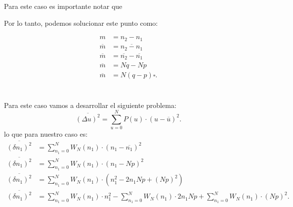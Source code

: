 \documentclass{report}
\begin{document}
\section{}

Para este caso es importante notar que

Por lo tanto, podemos solucionar este punto como:


  \begin{align*}
    m &= n_2 - n_1\\
    \overline{m} &= \overline{n_2 - n_1} \\
    \overline{m} &= \overline{n_2} - \overline{n_1} \\
    \overline{m} &= Nq - Np \\
    \overline{m} &= N\left( q - p \right) \square
  .\end{align*}

\section{}

Para este caso vamos a desarrollar el siguiente problema: \[
\overline{\left( \Delta u \right)^2} = \sum_{u=0}^{N} P(u)\cdot \left( u - \overline{u} \right)^2
.\] lo que para nuestro caso es:
\begin{align*}
  \overline{\left( \delta n_1 \right)^2 } &= \sum_{n_1 = 0}^{N} W_N\left( n_1 \right) \cdot \left( n_1 - \overline{n_1} \right)^2 \\
  \overline{\left( \delta n_1 \right)^2 } &= \sum_{n_1 = 0}^{N} W_N\left( n_1 \right) \cdot \left( n_1 - Np \right)^2 \\
  \overline{\left( \delta n_1 \right)^2 } &= \sum_{n_1 = 0}^{N} W_N\left( n_1 \right) \cdot \left( n_1^2 - 2n_1Np + \left( Np \right)^2 \right) \\
  \overline{\left( \delta n_1 \right)^2 } &= \sum_{n_1 = 0}^{N} W_N\left( n_1 \right) \cdot n_1^2 -\sum_{n_1 = 0}^{N} W_N\left( n_1 \right)\cdot  2n_1Np +\sum_{n_1 = 0}^{N} W_N\left( n_1 \right) \cdot \left( Np \right)^2
.\end{align*}
\end{document}

